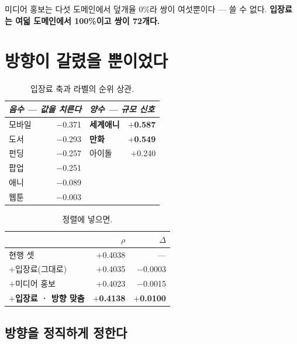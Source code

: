 \documentclass[10pt]{article}
\begin{document}
미디어 홍보는 다섯 도메인에서 덮개율 0\%라 쌍이 여섯뿐이다 --- 쓸 수 없다.
\textbf{입장료는 여덟 도메인에서 100\%이고 쌍이 72개다.}

\section{방향이 갈렸을 뿐이었다}

\begin{table}[t]
\centering\tsize
\caption{입장료 축과 라벨의 순위 상관.}
\begin{tabular}{lrlr}
\toprule
\multicolumn{2}{l}{\emph{음수 --- 값을 치른다}} &
\multicolumn{2}{l}{\emph{양수 --- 규모 신호}} \\
\midrule
모바일 & $-$0.371 & \textbf{세계애니} & \textbf{$+$0.587} \\
도서 & $-$0.293 & \textbf{만화} & \textbf{$+$0.549} \\
펀딩 & $-$0.257 & 아이돌 & $+$0.240 \\
팝업 & $-$0.251 & & \\
애니 & $-$0.089 & & \\
웹툰 & $-$0.003 & & \\
\bottomrule
\end{tabular}
\end{table}

\begin{table}[t]
\centering\tsize
\caption{정렬에 넣으면.}
\begin{tabular}{lrr}
\toprule
& $\rho$ & $\Delta$ \\
\midrule
현행 셋 & $+$0.4038 & --- \\
$+$입장료(그대로) & $+$0.4035 & $-$0.0003 \\
$+$미디어 홍보 & $+$0.4023 & $-$0.0015 \\
\textbf{$+$입장료 · 방향 맞춤} & \textbf{$+$0.4138} & \textbf{$+$0.0100} \\
\bottomrule
\end{tabular}
\end{table}


\subsection{방향을 정직하게 정한다}
\end{document}
